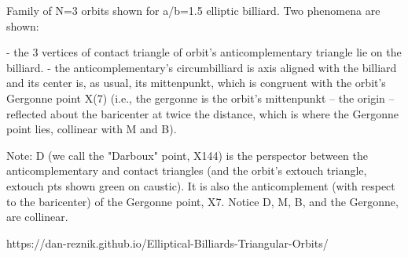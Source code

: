 Family of N=3 orbits shown for a/b=1.5 elliptic billiard. Two phenomena are shown:

- the 3 vertices of contact triangle of orbit's anticomplementary triangle lie on the billiard.
- the anticomplementary's circumbilliard is axis aligned with the billiard and its center is, as usual, its mittenpunkt, which is congruent with the orbit's Gergonne point X(7) (i.e., the gergonne is the orbit's mittenpunkt -- the origin -- reflected about the baricenter at twice the distance, which is where the Gergonne point lies, collinear with M and B).

Note: D (we call the "Darboux" point, X144) is the perspector between the anticomplementary and contact triangles (and the orbit's extouch triangle, extouch pts shown green on caustic). It is also the anticomplement (with respect to the baricenter) of the Gergonne point, X7. Notice D, M, B, and the Gergonne, are collinear.

https://dan-reznik.github.io/Elliptical-Billiards-Triangular-Orbits/